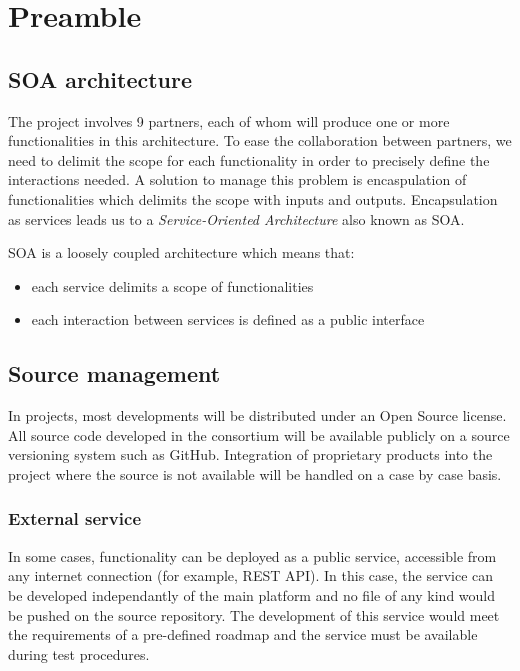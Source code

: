 \chapter{Preamble}
\label{ch:preamble}

\section{SOA architecture}
\label{sec:soa-architecture}

The \learnpad project involves 9 partners, each of whom will produce one or more functionalities
in this architecture. To ease the collaboration between partners, we need to delimit the scope
for each functionality in order to precisely define the interactions needed. A solution to manage
this problem is encaspulation of functionalities which delimits the scope with inputs and outputs.
Encapsulation as services leads us to a \emph{Service-Oriented Architecture} also known as SOA.

SOA is a loosely coupled architecture which means that:
\begin{itemize}
	\item each service delimits a scope of functionalities
	\item each interaction between services is defined as a public interface
\end{itemize}

\section{Source management}
\label{sec:source-management2}

In \learnpad projects, most developments will be distributed under an Open Source license.
All source code developed in the consortium will be available publicly on a source versioning
system such as GitHub. Integration of proprietary products into the project where the source
is not available will be handled on a case by case basis.

\subsection{External service}
\label{sec:external-service}

In some cases, functionality can be deployed as a public service, accessible from any internet
connection (for example, REST API). In this case, the service can be developed independantly of
the main \learnpad platform and no file of any kind would be pushed on the source repository.
The development of this service would meet the requirements of a pre-defined roadmap and the
service must be available during test procedures.

